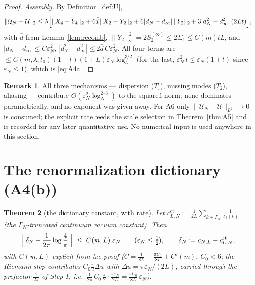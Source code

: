 \documentclass[11pt,a4paper]{article}
\theoremstyle{plain}
\newtheorem{theorem}{Theorem}[section]
\theoremstyle{definition}
\newtheorem{remark}[theorem]{Remark}
\newcommand{\eps}{\varepsilon}
\newcommand{\U}{\mathcal U}
\begin{document}
\begin{proof}
\emph{Assembly.} By Definition~\ref{def:U},
\[
 \|\U_N-\U\|_2\le\lambda\Bigl[\|X_4-Y_4\|_2+6\bar d\,\|X_2-Y_2\|_2
 +6|d_N-d_\infty|\,\|Y_2\|_2+3|d_N^2-d_\infty^2|\,(2Lt)\Bigr],
\]
with $\bar d$ from Lemma~\ref{lem:recomb}, $\|Y_2\|_2^2=2S_2^{(\infty)}\le
2\Sigma_1\le C(m)tL$, and $|d_N-d_\infty|\le C\eps_N^2$,
$|d_N^2-d_\infty^2|\le2\bar d\,C\eps_N^2$. All four terms are
$\le C(m,\lambda,t_0)(1+t)(1+L)\eps_N\log_N^{3/2}$ (for the last,
$\eps_N^2\,t\le\eps_N(1+t)$ since $\eps_N\le1$), which is \eqref{eq:A4a}.
\end{proof}

\begin{remark}
All three mechanisms --- dispersion ($T_1$), missing modes ($T_2$), aliasing
--- contribute $O(\eps_N^2\log_N^{2\text{--}3})$ to the squared norm; none
dominates parametrically, and no exponent was given away. For A6 only
$\|\U_N-\U\|_{L^2}\to0$ is consumed; the explicit rate feeds the scale
selection in Theorem~\ref{thm:A5} and is recorded for any later quantitative
use. No numerical input is used anywhere in this section.
\end{remark}

\section{The renormalization dictionary (A4(b))}\label{sec:dict}

\begin{theorem}[the dictionary constant, with rate]\label{thm:dict}
Let $c^{\mathrm{ct}}_{L,N}:=\frac1{2L}\sum_{k\in\Gamma_N}\frac1{2\gamma(k)}$
(the $\Gamma_N$-truncated continuum vacuum constant). Then
\begin{equation}
 \Bigl|\ \delta_N-\frac1{2\pi}\log\frac4\pi\ \Bigr|
 \;\le\;C(m,L)\;\eps_N
 \qquad(\eps_N\le\tfrac12),
 \qquad
 \delta_N:=c_{N,L}-c^{\mathrm{ct}}_{L,N},
 \label{eq:dict}
\end{equation}
with $C(m,L)$ explicit from the proof
($C=\tfrac1{8L}+\tfrac{\pi C_0}{8L}+C'(m)$, $C_0<6$: the Riemann step
contributes $C_0\tfrac\pi2\Delta u$ with $\Delta u=\pi\eps_N/(2L)$, carried
through the prefactor $\tfrac1{2\pi}$ of Step 1, i.e.\
$\tfrac1{2\pi}\,C_0\,\tfrac\pi2\cdot\tfrac{\pi\eps_N}{2L}
=\tfrac{\pi C_0}{8L}\,\eps_N$).
\end{theorem}
\end{document}
